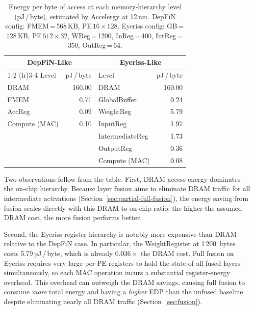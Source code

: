 \begin{table}[htbp]
  \centering
  \caption{Energy per byte of access at each memory-hierarchy level
           (pJ\,/\,byte), estimated by Accelergy at 12\,nm.
           DepFiN config: FMEM\,=\,568\,KB, PE\,$16{\times}128$.
           Eyeriss config: GB\,=\,128\,KB, PE\,$512{\times}32$,
           WReg\,=\,1200, InReg\,=\,400, IntReg\,=\,350,
           OutReg\,=\,64.}
  \label{tab:energy-per-byte}
  \small
  \begin{tabular}{l r @{\qquad\qquad} l r}
    \toprule
    \multicolumn{2}{c}{\textbf{DepFiN-Like}}
      & \multicolumn{2}{c}{\textbf{Eyeriss-Like}} \\
    \cmidrule(lr){1-2} \cmidrule(lr){3-4}
    Level & pJ\,/\,byte & Level & pJ\,/\,byte \\
    \midrule
    DRAM           & 160.00 & DRAM              & 160.00 \\
    FMEM           &  0.71  & GlobalBuffer      &  0.24  \\
    AccReg         &  0.09  & WeightReg         &  5.79  \\
    Compute (MAC)  &  0.10  & InputReg          &  1.97  \\
                   &        & IntermediateReg   &  1.73  \\
                   &        & OutputReg         &  0.36  \\
                   &        & Compute (MAC)     &  0.08  \\
    \bottomrule
  \end{tabular}
\end{table}

Two observations follow from the table.
First, DRAM access energy dominates the on-chip hierarchy.
Because layer fusion aims to eliminate DRAM traffic for all intermediate
activations (Section~\ref{sec:partial-full-fusion}), the energy
saving from fusion scales directly with this DRAM-to-on-chip ratio:
the higher the assumed DRAM cost, the more fusion performs better.

Second, the Eyeriss register hierarchy is notably more expensive than
DRAM-relative to the DepFiN case.
In particular, the WeightRegister at 1\,200~bytes costs
5.79\,pJ\,/\,byte, which is already $0.036\times$ the DRAM cost.
Full fusion on Eyeriss requires very large per-PE registers to hold
the state of all fused layers simultaneously, so each MAC operation
incurs a substantial register-energy overhead.
This overhead can outweigh the DRAM savings,
causing full fusion to consume \emph{more} total energy and having a \textit{higher}
EDP than the unfused baseline despite eliminating nearly all DRAM traffic
(Section~\ref{sec:fusion}).

